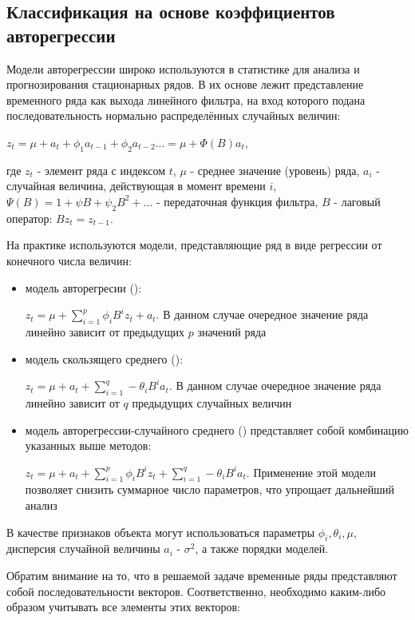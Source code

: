 \subsection{Классификация на основе коэффициентов авторегрессии}

Модели авторегрессии широко используются в статистике для анализа и прогнозирования стационарных рядов. В их основе лежит представление временного ряда как выхода линейного фильтра, на вход которого подана последовательность нормально распределённых случайных величин:

$z_t=\mu+a_t+\phi_1a_{t-1}+\phi_2a_{t-2}...=\mu+\Phi(B)a_t$, 

где $z_t$ - элемент ряда с индексом $t$, $\mu$ - среднее значение (уровень) ряда, $a_i$ - случайная величина, действующая в момент времени $i$, $\Psi(B)=1+\psi B+\psi_2 B^2+...$ - передаточная функция фильтра, $B$ - лаговый оператор: $Bz_t=z_{t-1}$.

На практике используются модели, представляющие ряд в виде регрессии от конечного числа величин\cite{bj_ts}: 

\begin{itemize}
\item модель авторегресии (): 

$z_t=\mu+\sum_{i=1}^p \phi_iB^i z_t + a_t$. В данном случае очередное значение ряда линейно зависит от предыдущих $p$ значений ряда
\item модель скользящего среднего ():

$z_t=\mu + a_t + \sum_{i=1}^q -\theta_iB^i a_t $. В данном случае очередное значение ряда линейно зависит от $q$ предыдущих случайных величин
\item модель авторегрессии-случайного среднего () представляет собой комбинацию указанных выше методов:

$z_t=\mu + a_t + \sum_{i=1}^p \phi_iB^i z_t + \sum_{i=1}^q -\theta_iB^i a_t $. Применение этой модели позволяет снизить суммарное число параметров, что упрощает дальнейший анализ
\end{itemize}

В качестве признаков объекта могут использоваться параметры $\phi_i, \theta_i, \mu$, дисперсия случайной величины $a_i$ - $\sigma^2$, а также порядки моделей.

Обратим внимание на то, что в решаемой задаче временные ряды представляют собой последовательности векторов. Соответственно, необходимо каким-либо образом учитывать все элементы этих векторов:

